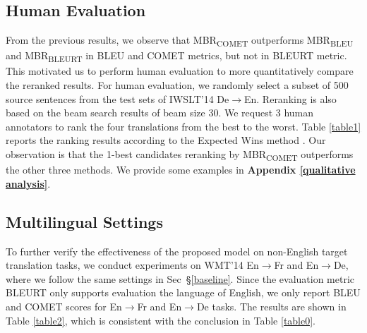 \documentclass{article}
\begin{document}
\subsection{Human Evaluation} \label{sec:human}
From the previous results, we observe that MBR\textsubscript{COMET} outperforms MBR\textsubscript{BLEU} and MBR\textsubscript{BLEURT} in BLEU and COMET metrics, but not in BLEURT metric. This motivated us to perform human evaluation to more quantitatively compare the reranked results. For human evaluation, we randomly select a subset of 500 source sentences from the test sets of IWSLT’14 De$\to$En. Reranking is also based on the beam search results of beam size 30. We request 3 human annotators to rank the four translations from the best to the worst. Table \ref{table1} reports the ranking results according to the Expected Wins method \cite{54}. Our observation is that the 1-best candidates reranking by MBR\textsubscript{COMET} outperforms the other three methods. We provide some examples in \textbf{Appendix \ref{qualitative analysis}}. %


\subsection{Multilingual Settings}
To further verify the effectiveness of the proposed model on non-English target translation tasks, we conduct experiments on WMT’14 En$\to$Fr and En$\to$De, where we follow the same settings in Sec~\S\ref{baseline}. Since the evaluation metric BLEURT only supports evaluation the language of English, we only report BLEU and COMET scores for En$\to$Fr and En$\to$De tasks. The results are shown in Table \ref{table2}, which is consistent with the conclusion in Table \ref{table0}. 
\end{document}
